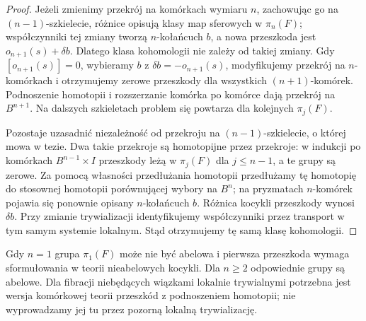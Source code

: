 \begin{proof}
Jeżeli zmienimy przekrój na komórkach wymiaru $n$,
zachowując go na $(n-1)$-szkielecie, różnice
opisują klasy map sferowych w $\pi_n(F)$; współczynniki
tej zmiany tworzą $n$-kołańcuch $b$, a nowa przeszkoda jest
$o_{n+1}(s)+\delta b$. Dlatego klasa kohomologii
nie zależy od takiej zmiany. Gdy $[o_{n+1}(s)]=0$,
wybieramy $b$ z $\delta b=-o_{n+1}(s)$,
modyfikujemy przekrój na $n$-komórkach i otrzymujemy
zerowe przeszkody dla wszystkich $(n+1)$-komórek.
Podnoszenie homotopii i rozszerzanie komórka po komórce
dają przekrój na $B^{n+1}$. Na dalszych szkieletach
problem się powtarza dla kolejnych $\pi_j(F)$.

Pozostaje uzasadnić niezależność od przekroju na
$(n-1)$-szkielecie, o której mowa w tezie.
Dwa takie przekroje są homotopijne przez przekroje:
w indukcji po komórkach $B^{n-1}\times I$ przeszkody
leżą w $\pi_j(F)$ dla $j\le n-1$, a te grupy są zerowe.
Za pomocą własności przedłużania homotopii
przedłużamy tę homotopię do stosownej homotopii
porównującej wybory na $B^n$; na pryzmatach
$n$-komórek pojawia się ponownie opisany
$n$-kołańcuch $b$. Różnica kocykli przeszkody
wynosi $\delta b$. Przy zmianie trywializacji
identyfikujemy współczynniki przez transport
w tym samym systemie lokalnym. Stąd otrzymujemy
tę samą klasę kohomologii.
\end{proof}

\begin{uwaga}
Gdy $n=1$ grupa $\pi_1(F)$ może nie być abelowa i
pierwsza przeszkoda wymaga sformułowania w teorii
nieabelowych kocykli. Dla $n\ge2$ odpowiednie grupy
są abelowe. Dla fibracji niebędących wiązkami lokalnie
trywialnymi potrzebna jest wersja komórkowej teorii
przeszkód z podnoszeniem homotopii; nie wyprowadzamy
jej tu przez pozorną lokalną trywializację.
\end{uwaga}


